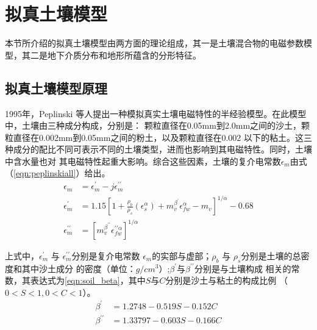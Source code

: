 \section{拟真土壤模型}
本节所介绍的拟真土壤模型由两方面的理论组成，其一是土壤混合物的电磁参数模型，其二是地下介质分布和地形所蕴含的分形特征。
\subsection{拟真土壤模型原理}
1995年，Peplinski 等人提出一种模拟真实土壤电磁特性的半经验模型。在此模型中，土壤由三种成分构成，分别是：
颗粒直径在0.05mm到2.0mm之间的沙土，颗粒直径在0.002mm到0.05mm之间的粉土，以及颗粒直径在0.002
以下的粘土。这三种成分的配比不同可表示不同的土壤类型，进而也影响到其电磁特性。同时，土壤中含水量也对
其电磁特性起重大影响。综合这些因素，土壤的复介电常数$\epsilon_m$由式（\ref{eqn:peplinskiall}）给出。
\begin{equation} 
	\label{eqn:peplinskiall} 
	\begin{aligned} \epsilon_{m} &=\epsilon_{m}^{\prime}-j \epsilon_{m}^{\prime \prime} \\ 
\epsilon_{m}^{\prime} &=1.15 \left[1+\frac{\rho_{b}}{\rho_{s}}\left(\epsilon_{s}^{\alpha}\right)+m_{v}^{\beta^{\prime}} \epsilon_{f w}^{\alpha}-m_{v}\right]^{1 / \alpha} - 0.68\\ 
\epsilon_{m}^{\prime \prime} &=\left[m_{v}^{\beta^{\prime \prime}} \epsilon_{f w}^{\prime \prime \alpha}\right]^{1 / \alpha} \end{aligned}
\end{equation}

上式中，$\epsilon_{m}^{\prime}$ 与 $\epsilon_{m}^{\prime \prime}$分别是复介电常数
$\epsilon_m$的实部与虚部；$\rho_{b}$ 与 $\rho_{s}$分别是土壤的总密度和其中沙土成分
的密度（单位：$g/cm^3$）;$\beta^\prime$与$\beta^{\prime \prime}$分别是与土壤构成
相关的常数，其表达式为\ref{eqn:soil_beta}，其中$S$与$C$分别是沙土与粘土的构成比例
（$0<S<1, 0<C<1$）。
\begin{equation} 
	\label{eqn:soil_beta}
	\begin{aligned}
\beta^{\prime}&=1.2748-0.519 S-0.152 C \\
\beta^{\prime \prime}&=1.33797-0.603 S-0.166 C
	\end{aligned}
\end{equation}

